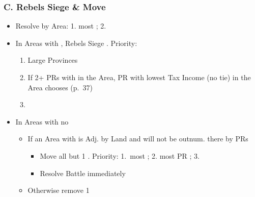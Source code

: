\documentclass[10pt]{article}
\begin{document}
\subsubsection*{C. Rebels Siege \& Move}
\begin{itemize}
	\item Resolve by Area: 1. most \rebels; 2. \az
	\item In Areas with \unrest, Rebels Siege \unrest. Priority:
	\begin{enumerate}
		\item Large Provinces
		\item If 2+ PRs with \unrest in the Area, PR with lowest Tax Income (no tie) in the Area chooses (p.~37)
		\item \az
	\end{enumerate}
	\item In Areas with no \unrest
	\begin{itemize}
		\item If an Area with \unrest is Adj. by Land and \rebels will not be outnum. there by PRs
		\begin{itemize}
			\item Move all but 1 \rebel. Priority: 1. most \unrest; 2. most PR \towns; 3. \az
			\item Resolve Battle immediately
		\end{itemize}
		\item Otherwise remove 1\rebel
	\end{itemize}
\end{itemize}
\end{document}
